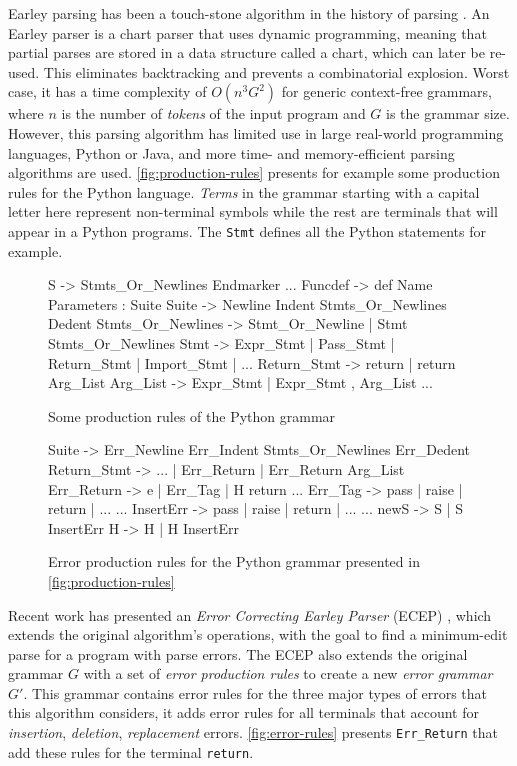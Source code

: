 Earley parsing has been a touch-stone algorithm in the
history of parsing \citep{?}. An Earley parser is a chart parser that uses
dynamic programming, meaning that partial parses are stored in a data structure
called a chart, which can later be re-used. This eliminates backtracking and
prevents a combinatorial explosion. Worst case, it has a time complexity of
$O(n^3 G^2)$ for generic context-free grammars, where $n$ is the number of
\emph{tokens} of the input program and $G$ is the grammar size. However, this
parsing algorithm has limited use in large real-world programming languages, \eg
Python or Java, and more time- and memory-efficient parsing algorithms are used.
\autoref{fig:production-rules} presents for example some production rules for
the Python language. \emph{Terms} in the grammar starting with a capital letter
here represent non-terminal symbols while the rest are terminals that will
appear in a Python programs. The \texttt{Stmt} defines all the Python statements
for example.

\begin{figure}[ht]
\begin{ecode}
S -> Stmts_Or_Newlines Endmarker
...
Funcdef -> def Name Parameters : Suite
Suite -> Newline Indent Stmts_Or_Newlines Dedent
Stmts_Or_Newlines -> Stmt_Or_Newline | Stmt Stmts_Or_Newlines
Stmt -> Expr_Stmt | Pass_Stmt | Return_Stmt | Import_Stmt | ...
Return_Stmt -> return | return Arg_List
Arg_List -> Expr_Stmt | Expr_Stmt , Arg_List
...
\end{ecode}
\caption{Some production rules of the Python grammar}
\label{fig:production-rules}
\end{figure}

\begin{figure}[ht]
\begin{ecode}
Suite -> Err_Newline Err_Indent Stmts_Or_Newlines Err_Dedent
Return_Stmt -> ... | Err_Return | Err_Return Arg_List
Err_Return -> e | Err_Tag | H return
...
Err_Tag -> pass | raise | return | ...
...
InsertErr -> pass | raise | return | ...
...
newS -> S | S InsertErr
H -> H | H InsertErr
\end{ecode}
\caption{Error production rules for the Python grammar presented in
\autoref{fig:production-rules}}
\label{fig:error-rules}
\end{figure}

 Recent work has presented an \emph{Error
Correcting Earley Parser} (ECEP) \citep{?}, which extends the original
algorithm's operations, with the goal to find a minimum-edit parse for a program
with parse errors. The ECEP also extends the original grammar $G$ with a set of
\emph{error production rules} to create a new \emph{error grammar} $G'$. This
grammar contains error rules for the three major types of errors that this
algorithm considers, \ie it adds error rules for all terminals that account for
\emph{insertion}, \emph{deletion}, \emph{replacement} errors.
\autoref{fig:error-rules} presents \texttt{Err\_Return} that add these rules for
the terminal \texttt{return}.

